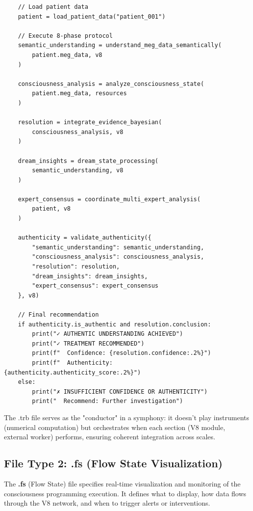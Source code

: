 \begin{verbatim}
    // Load patient data
    patient = load_patient_data("patient_001")
    
    // Execute 8-phase protocol
    semantic_understanding = understand_meg_data_semantically(
        patient.meg_data, v8
    )
    
    consciousness_analysis = analyze_consciousness_state(
        patient.meg_data, resources
    )
    
    resolution = integrate_evidence_bayesian(
        consciousness_analysis, v8
    )
    
    dream_insights = dream_state_processing(
        semantic_understanding, v8
    )
    
    expert_consensus = coordinate_multi_expert_analysis(
        patient, v8
    )
    
    authenticity = validate_authenticity({
        "semantic_understanding": semantic_understanding,
        "consciousness_analysis": consciousness_analysis,
        "resolution": resolution,
        "dream_insights": dream_insights,
        "expert_consensus": expert_consensus
    }, v8)
    
    // Final recommendation
    if authenticity.is_authentic and resolution.conclusion:
        print("✓ AUTHENTIC UNDERSTANDING ACHIEVED")
        print("✓ TREATMENT RECOMMENDED")
        print(f"  Confidence: {resolution.confidence:.2%}")
        print(f"  Authenticity: {authenticity.authenticity_score:.2%}")
    else:
        print("✗ INSUFFICIENT CONFIDENCE OR AUTHENTICITY")
        print("  Recommend: Further investigation")
\end{verbatim}

\begin{proposition}
The .trb file serves as the "conductor" in a symphony: it doesn't play instruments (numerical computation) but orchestrates when each section (V8 module, external worker) performs, ensuring coherent integration across scales.
\end{proposition}

\subsection{File Type 2: .fs (Flow State Visualization)}

\begin{definition}
The \textbf{.fs} (Flow State) file specifies real-time visualization and monitoring of the consciousness programming execution. It defines what to display, how data flows through the V8 network, and when to trigger alerts or interventions.
\end{definition}

